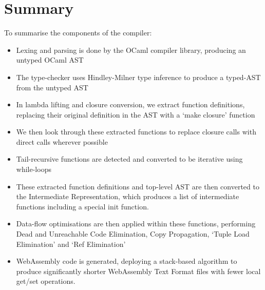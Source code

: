 \section{Summary}
To summarise the components of the compiler:
\begin{itemize}
\item Lexing and parsing is done by the OCaml compiler library, producing an untyped OCaml AST
\item The type-checker uses Hindley-Milner type inference to produce a typed-AST from the untyped AST
\item In lambda lifting and closure conversion, we extract function definitions, replacing their original definition in the AST with a `make closure' function
\item We then look through these extracted functions to replace closure calls with direct calls wherever possible
\item Tail-recursive functions are detected and converted to be iterative using while-loops
\item These extracted function definitions and top-level AST are then converted to the Intermediate Representation, which produces a list of intermediate functions including a special init function.
\item Data-flow optimisations are then applied within these functions, performing Dead and Unreachable Code Elimination, Copy Propagation, `Tuple Load Elimination' and `Ref Elimination'
\item WebAssembly code is generated, deploying a stack-based algorithm to produce significantly shorter WebAssembly Text Format files with fewer local get/set operations.
\end{itemize}


